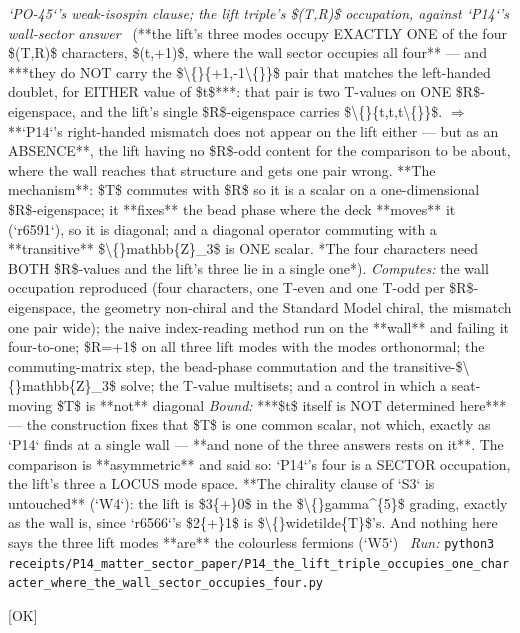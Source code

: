 \begin{description}
\textit{`PO-45`'s weak-isospin clause; the lift triple's \$(T,R)\$ occupation, against `P14`'s wall-sector answer} \ (**the lift's three modes occupy EXACTLY ONE of the four \$(T,R)\$ characters, \$(t,+1)\$, where the wall sector occupies all four** --- and ***they do NOT carry the \$\textbackslash\{\}\{+1,-1\textbackslash\{\}\}\$ pair that matches the left-handed doublet, for EITHER value of \$t\$***: that pair is two T-values on ONE \$R\$-eigenspace, and the lift's single \$R\$-eigenspace carries \$\textbackslash\{\}\{t,t,t\textbackslash\{\}\}\$. \ensuremath{\Rightarrow} **`P14`'s right-handed mismatch does not appear on the lift either --- but as an ABSENCE**, the lift having no \$R\$-odd content for the comparison to be about, where the wall reaches that structure and gets one pair wrong.  **The mechanism**: \$T\$ commutes with \$R\$ so it is a scalar on a one-dimensional \$R\$-eigenspace; it **fixes** the bead phase where the deck **moves** it (`r6591`), so it is diagonal; and a diagonal operator commuting with a **transitive** \$\textbackslash\{\}mathbb\{Z\}\_3\$ is ONE scalar. *The four characters need BOTH \$R\$-values and the lift's three lie in a single one*). 
\emph{Computes:} the wall occupation reproduced (four characters, one T-even and one T-odd per \$R\$-eigenspace, the geometry non-chiral and the Standard Model chiral, the mismatch one pair wide); the naive index-reading method run on the **wall** and failing it four-to-one; \$R=+1\$ on all three lift modes with the modes orthonormal; the commuting-matrix step, the bead-phase commutation and the transitive-\$\textbackslash\{\}mathbb\{Z\}\_3\$ solve; the T-value multisets; and a control in which a seat-moving \$T\$ is **not** diagonal
 \emph{Bound:}  ***\$t\$ itself is NOT determined here*** --- the construction fixes that \$T\$ is one common scalar, not which, exactly as `P14` finds at a single wall --- **and none of the three answers rests on it**. The comparison is **asymmetric** and said so: `P14`'s four is a SECTOR occupation, the lift's three a LOCUS mode space.  **The chirality clause of `S3` is untouched** (`W4`): the lift is \$3\{+\}0\$ in the \$\textbackslash\{\}gamma\textasciicircum{}\{5\}\$ grading, exactly as the wall is, since `r6566`'s \$2\{+\}1\$ is \$\textbackslash\{\}widetilde\{T\}\$'s. And nothing here says the three lift modes **are** the colourless fermions (`W5`)
\ \emph{Run:} \texttt{python3 receipts/P14\_matter\_sector\_paper/P14\_the\_lift\_triple\_occupies\_one\_character\_where\_the\_wall\_sector\_occupies\_four.py}
\item[\rcptlabel{P14_the_stratifications_two_valued_data_are_one_involution_and_it_is_R}{P14R76}\textbf{P14R76}\quad\texttt{P14\_the\_stratifications\_two\_valued\_data\_are\_one\_involution\_and\_it\_is\_R}]\hfill\textsf{[OK]}\\

\end{description}
